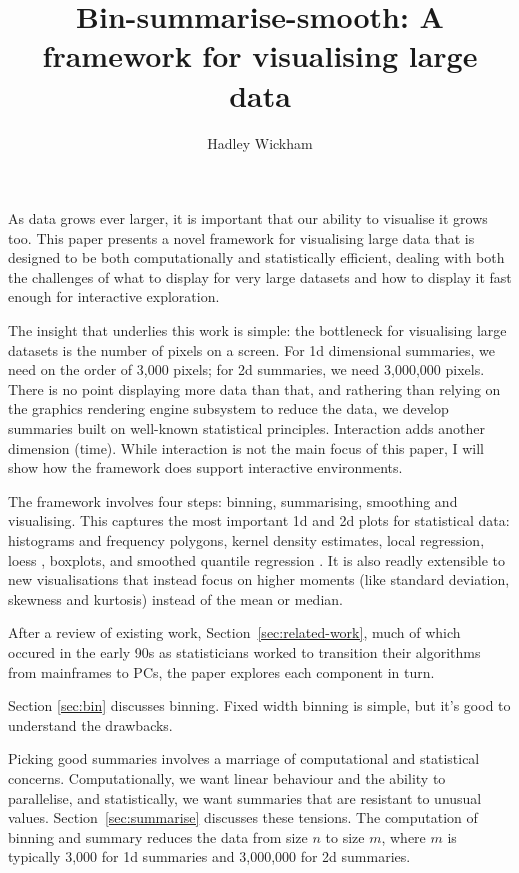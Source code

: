 \documentclass[journal]{vgtc}                %
\title{Bin-summarise-smooth: A framework for visualising large data}
\author{Hadley Wickham}
\begin{document}

\maketitle

As data grows ever larger, it is important that our ability to visualise it grows too. This paper presents a novel framework for visualising large data that is designed to be both computationally and statistically efficient, dealing with both the challenges of what to display for very large datasets and how to display it fast enough for interactive exploration.

The insight that underlies this work is simple: the bottleneck for visualising large datasets is the number of pixels on a screen. For 1d dimensional summaries, we need on the order of 3,000 pixels; for 2d summaries, we need 3,000,000 pixels. There is no point displaying more data than that, and rathering than relying on the graphics rendering engine subsystem to reduce the data, we develop summaries built on well-known statistical principles. Interaction adds another dimension (time). While interaction is not the main focus of this paper, I will show how the framework does support interactive environments.

The framework involves four steps: binning, summarising, smoothing and visualising. This captures the most important 1d and 2d plots for statistical data: histograms and frequency polygons, kernel density estimates, local regression, loess \citep{cleveland:1979}, boxplots, and smoothed quantile regression \citep{koenker:2005}. It is also readly extensible to new visualisations that instead focus on higher moments (like standard deviation, skewness and kurtosis) instead of the mean or median.

After a review of existing work, Section~\ref{sec:related-work}, much of which occured in the early 90s as statisticians worked to transition their algorithms from mainframes to PCs, the paper explores each component in turn.


Section \ref{sec:bin} discusses binning. Fixed width binning is simple, but it's good to understand the drawbacks.

Picking good summaries involves a marriage of computational and statistical  concerns. Computationally, we want linear behaviour and the ability to parallelise, and statistically, we want summaries that are resistant to unusual values. Section~\ref{sec:summarise} discusses these tensions. The computation of binning and summary reduces the data from size $n$ to size $m$, where $m$ is typically 3,000 for 1d summaries and 3,000,000 for 2d summaries.
\end{document}
